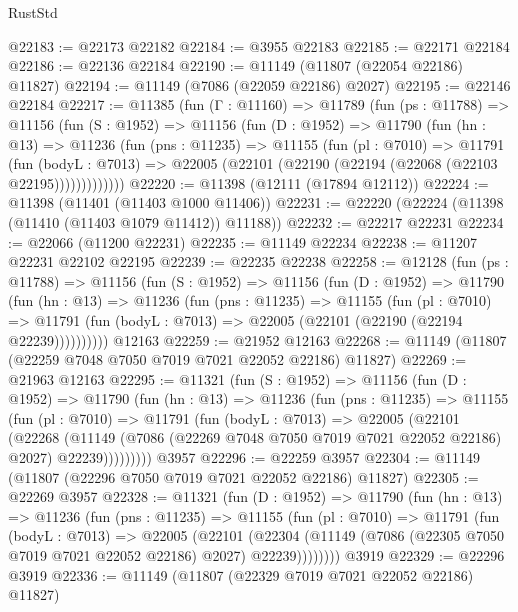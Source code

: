 \begin{lexlean}{RustStd}
\begin{coremodule}
@22183 := @22173 @22182
@22184 := @3955 @22183
@22185 := @22171 @22184
@22186 := @22136 @22184
@22190 := @11149 (@11807 (@22054 @22186) @11827)
@22194 := @11149 (@7086 (@22059 @22186) @2027)
@22195 := @22146 @22184
@22217 := @11385
    (fun (Γ : @11160) =>
    @11789
      (fun (ps : @11788) =>
      @11156
        (fun (S : @1952) =>
        @11156
          (fun (D : @1952) =>
          @11790
            (fun (hn : @13) =>
            @11236
              (fun (pns : @11235) =>
              @11155
                (fun (pl : @7010) =>
                @11791
                  (fun (bodyL : @7013) =>
                  @22005 (@22101 (@22190 (@22194 (@22068 (@22103 @22195)))))))))))))
@22220 := @11398 (@12111 (@17894 @12112))
@22224 := @11398 (@11401 (@11403 @1000 @11406))
@22231 := @22220 (@22224 (@11398 (@11410 (@11403 @1079 @11412)) @11188))
@22232 := @22217 @22231
@22234 := @22066 (@11200 @22231)
@22235 := @11149 @22234
@22238 := @11207 @22231 @22102 @22195
@22239 := @22235 @22238
@22258 := @12128
    (fun (ps : @11788) =>
    @11156
      (fun (S : @1952) =>
      @11156
        (fun (D : @1952) =>
        @11790
          (fun (hn : @13) =>
          @11236
            (fun (pns : @11235) =>
            @11155
              (fun (pl : @7010) =>
              @11791 (fun (bodyL : @7013) => @22005 (@22101 (@22190 (@22194 @22239))))))))))
    @12163
@22259 := @21952 @12163
@22268 := @11149 (@11807 (@22259 @7048 @7050 @7019 @7021 @22052 @22186) @11827)
@22269 := @21963 @12163
@22295 := @11321
    (fun (S : @1952) =>
    @11156
      (fun (D : @1952) =>
      @11790
        (fun (hn : @13) =>
        @11236
          (fun (pns : @11235) =>
          @11155
            (fun (pl : @7010) =>
            @11791
              (fun (bodyL : @7013) =>
              @22005
                (@22101
                  (@22268
                    (@11149
                      (@7086 (@22269 @7048 @7050 @7019 @7021 @22052 @22186) @2027)
                      @22239)))))))))
    @3957
@22296 := @22259 @3957
@22304 := @11149 (@11807 (@22296 @7050 @7019 @7021 @22052 @22186) @11827)
@22305 := @22269 @3957
@22328 := @11321
    (fun (D : @1952) =>
    @11790
      (fun (hn : @13) =>
      @11236
        (fun (pns : @11235) =>
        @11155
          (fun (pl : @7010) =>
          @11791
            (fun (bodyL : @7013) =>
            @22005
              (@22101
                (@22304
                  (@11149 (@7086 (@22305 @7050 @7019 @7021 @22052 @22186) @2027) @22239))))))))
    @3919
@22329 := @22296 @3919
@22336 := @11149 (@11807 (@22329 @7019 @7021 @22052 @22186) @11827)

\end{coremodule}
\end{lexlean}
